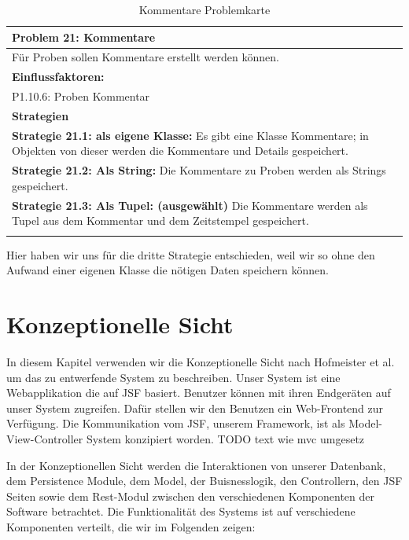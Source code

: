 \documentclass[enabledeprecatedfontcommands,fontsize=12pt,paper=a4,twoside]{scrartcl}
\begin{document}
\begin{table}[H]
    \centering
    \begin{tabular}{|p{15cm}|}
    \hline
          \textbf{Problem 21:} Kommentare
          \\ \hline
          Für Proben sollen Kommentare erstellt werden können. 
          \\ \hline
          \textbf{Einflussfaktoren: } \\
         P1.10.6: Proben Kommentar \\ 
          \hline
          \textbf{Strategien} \\ \hline
          {}          
           \label{strategie:21.1} 
	\textbf{Strategie 21.1: als eigene Klasse: } Es gibt eine Klasse Kommentare; in Objekten von dieser werden die Kommentare und Details gespeichert. \\
	{}          
           \label{strategie:21.2} 
	\textbf{Strategie 21.2: Als String:} Die Kommentare zu Proben werden als Strings gespeichert. \\
	\textbf{Strategie 21.3: Als Tupel: (ausgewählt)} Die Kommentare werden als Tupel aus dem Kommentar und dem Zeitstempel gespeichert. \\
          \\ \hline
    \end{tabular}
    \caption{Kommentare Problemkarte}
    \label{tab:ProblemKarte21}
\end{table}
Hier haben wir uns für die dritte Strategie entschieden, weil wir so ohne den Aufwand einer eigenen Klasse die nötigen Daten speichern können. \\



\section{Konzeptionelle Sicht}
\label{sec:konzeptionell} { %
In diesem Kapitel verwenden wir die Konzeptionelle Sicht nach Hofmeister
et al. um das zu entwerfende System zu beschreiben. Unser System ist eine
Webapplikation die auf JSF basiert. Benutzer können mit ihren Endgeräten auf
unser System zugreifen. Dafür stellen wir den Benutzen ein Web-Frontend
zur Verfügung. Die Kommunikation vom JSF, unserem Framework, ist als
Model-View-Controller System konzipiert worden. TODO text wie mvc umgesetz

  In der Konzeptionellen Sicht werden die Interaktionen von unserer Datenbank,
dem Persistence Module, dem Model, der Buisnesslogik, den Controllern, den JSF
Seiten sowie dem Rest-Modul zwischen den verschiedenen Komponenten der Software
betrachtet. Die Funktionalität des Systems ist auf verschiedene Komponenten
verteilt, die wir im Folgenden zeigen:\\
}
\end{document}
